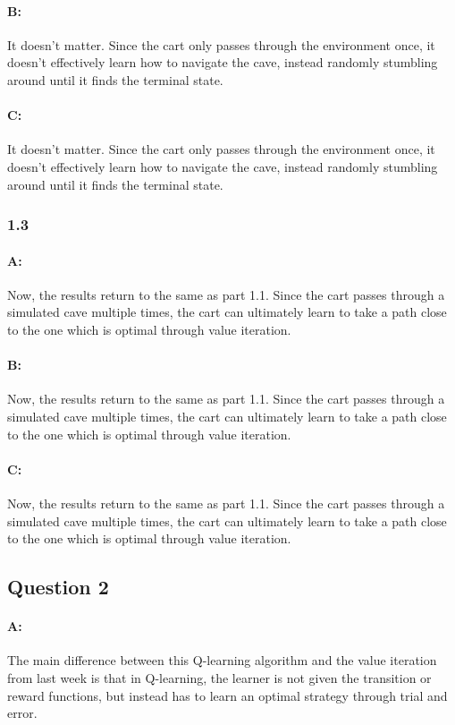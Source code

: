 \documentclass{article}
\begin{document}
\paragraph{B: } It doesn't matter. Since the cart only passes through the environment once, it doesn't effectively learn how to navigate the cave, instead randomly stumbling around until it finds the terminal state.

\paragraph{C: } It doesn't matter. Since the cart only passes through the environment once, it doesn't effectively learn how to navigate the cave, instead randomly stumbling around until it finds the terminal state.

\subsubsection{1.3}

\paragraph{A: } Now, the results return to the same as part 1.1. Since the cart passes through a simulated cave multiple times, the cart can ultimately learn to take a path close to the one which is optimal through value iteration.

\paragraph{B: } Now, the results return to the same as part 1.1. Since the cart passes through a simulated cave multiple times, the cart can ultimately learn to take a path close to the one which is optimal through value iteration.

\paragraph{C: } Now, the results return to the same as part 1.1. Since the cart passes through a simulated cave multiple times, the cart can ultimately learn to take a path close to the one which is optimal through value iteration.

\subsection{Question 2}

\paragraph{A: } The main difference between this Q-learning algorithm and the value iteration from last week is that in Q-learning, the learner is not given the transition or reward functions, but instead has to learn an optimal strategy through trial and error.
\end{document}
